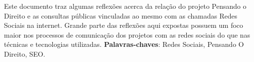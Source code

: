 \setlength{\absparsep}{18pt} %
\begin{resumo}
Este documento traz algumas reflexões acerca da relação do projeto Pensando o Direito e as consultas públicas vinculadas ao mesmo com as chamadas Redes Sociais na internet.
%
Grande parte das reflexões aqui expostas possuem um foco maior nos processos de comunicação dos projetos com as redes sociais do que nas técnicas e tecnologias utilizadas.
 \vfill
 \noindent
 \textbf{Palavras-chaves}: Redes Sociais, Pensando O Direito, SEO.
 \vfill
\end{resumo}
